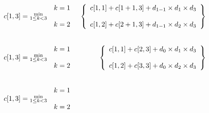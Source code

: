 \documentclass{report}
\begin{document}
	\begin{eqnarray}
		\begin{array}{c}
			\\
			c[1,3] = \substack{\text{min}\\1\leq k < 3}\\
			\\
		\end{array}&
		\begin{array}{c}
			k=1\\
			\\
			k=2\\
		\end{array}&
		\left\{
			\begin{array}{l}
				c[1,1]+ c[1 + 1,3] + d_{1-1} \times d_1 \times d_3\\
				\\
				c[1,2] + c[2 + 1,3] + d_{1-1} \times d_2 \times d_3 \\
			\end{array}
		\right\}\notag\\[0.7cm]
		\begin{array}{c}
			\\
			c[1,3] = \substack{\text{min}\\1\leq k < 3}\\
			\\
		\end{array}&
		\begin{array}{c}
			k=1\\
			\\
			k=2\\
		\end{array}&
		\left\{
		\begin{array}{l}
			c[1,1]+ c[2,3] + d_{0} \times d_1 \times d_3\\
			\\
			c[1,2] + c[3,3] + d_{0} \times d_2 \times d_3 \\
		\end{array}
		\right\}\notag\\[0.7cm]
		\begin{array}{c}
			\\
			c[1,3] = \substack{\text{min}\\1\leq k < 3}\\
			\\
		\end{array}&
		\begin{array}{c}
			k=1\\
			\\
			k=2\\

\end{array}
\end{eqnarray}
\end{document}

